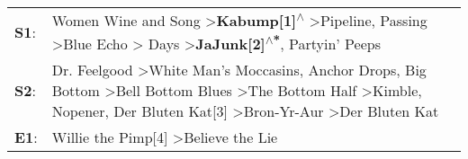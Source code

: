 \begin{supertabular}{p{0.03\textwidth}p{0.92\textwidth}}
 \textbf{S1}:  &                                                                                                                              Women Wine and Song\textsuperscript{} \textgreater \enspace \textbf{Kabump[1]\textsuperscript{$\wedge$}} \textgreater \enspace Pipeline\textsuperscript{}, \enspace Passing\textsuperscript{} \textgreater \enspace Blue Echo\textsuperscript{} \textgreater {} Days\textsuperscript{} \textgreater \enspace \textbf{JaJunk[2]\textsuperscript{$\wedge$*}}, \enspace Partyin' Peeps\textsuperscript{}  \enspace  \\
 \textbf{S2}:  &  Dr. Feelgood\textsuperscript{} \textgreater \enspace White Man's Moccasins\textsuperscript{}, \enspace Anchor Drops\textsuperscript{}, \enspace Big Bottom\textsuperscript{} \textgreater \enspace Bell Bottom Blues\textsuperscript{} \textgreater \enspace The Bottom Half\textsuperscript{} \textgreater \enspace Kimble\textsuperscript{}, \enspace Nopener\textsuperscript{}, \enspace Der Bluten Kat[3]\textsuperscript{} \textgreater \enspace Bron-Yr-Aur\textsuperscript{} \textgreater \enspace Der Bluten Kat\textsuperscript{}  \enspace  \\
 \textbf{E1}:  &                                                                                                                                                                                                                                                                                                                                                                                                                                                Willie the Pimp[4]\textsuperscript{} \textgreater \enspace Believe the Lie\textsuperscript{}  \enspace  \\
\end{supertabular}
